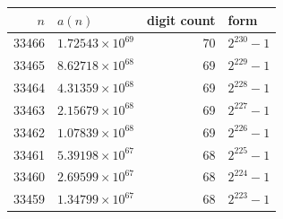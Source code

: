 \begin{tabular}{rlrl}
\toprule
$n$ & $a(n)$ & digit count & form \\
\midrule
33466 & $1.72543\times 10^{69}$ & 70 & $2^{230}-1$ \\
33465 & $8.62718\times 10^{68}$ & 69 & $2^{229}-1$ \\
33464 & $4.31359\times 10^{68}$ & 69 & $2^{228}-1$ \\
33463 & $2.15679\times 10^{68}$ & 69 & $2^{227}-1$ \\
33462 & $1.07839\times 10^{68}$ & 69 & $2^{226}-1$ \\
33461 & $5.39198\times 10^{67}$ & 68 & $2^{225}-1$ \\
33460 & $2.69599\times 10^{67}$ & 68 & $2^{224}-1$ \\
33459 & $1.34799\times 10^{67}$ & 68 & $2^{223}-1$ \\
\bottomrule
\end{tabular}
